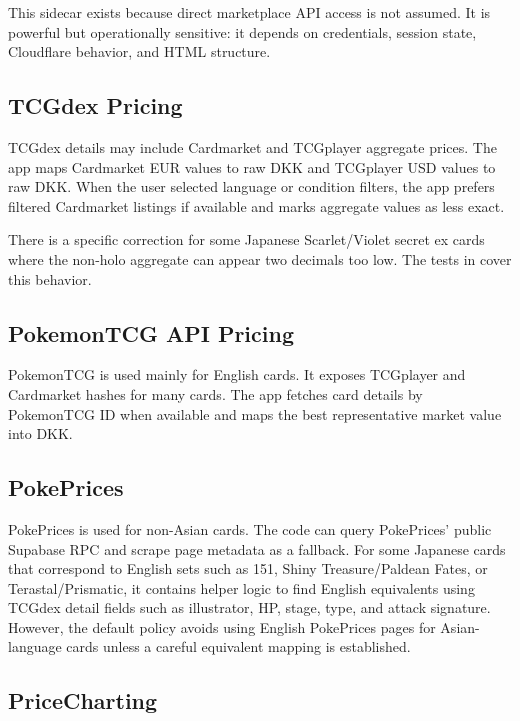 \documentclass[11pt,a4paper]{article}
\begin{document}
This sidecar exists because direct marketplace API access is not assumed. It is powerful but operationally sensitive: it depends on credentials, session state, Cloudflare behavior, and HTML structure.

\subsection{TCGdex Pricing}

TCGdex details may include Cardmarket and TCGplayer aggregate prices. The app maps Cardmarket EUR values to raw DKK and TCGplayer USD values to raw DKK. When the user selected language or condition filters, the app prefers filtered Cardmarket listings if available and marks aggregate values as less exact.

There is a specific correction for some Japanese Scarlet/Violet secret ex cards where the non-holo aggregate can appear two decimals too low. The tests in  cover this behavior.

\subsection{PokemonTCG API Pricing}

PokemonTCG is used mainly for English cards. It exposes TCGplayer and Cardmarket hashes for many cards. The app fetches card details by PokemonTCG ID when available and maps the best representative market value into DKK.

\subsection{PokePrices}

PokePrices is used for non-Asian cards. The code can query PokePrices' public Supabase RPC and scrape page metadata as a fallback. For some Japanese cards that correspond to English sets such as 151, Shiny Treasure/Paldean Fates, or Terastal/Prismatic, it contains helper logic to find English equivalents using TCGdex detail fields such as illustrator, HP, stage, type, and attack signature. However, the default policy avoids using English PokePrices pages for Asian-language cards unless a careful equivalent mapping is established.

\subsection{PriceCharting}
\end{document}
